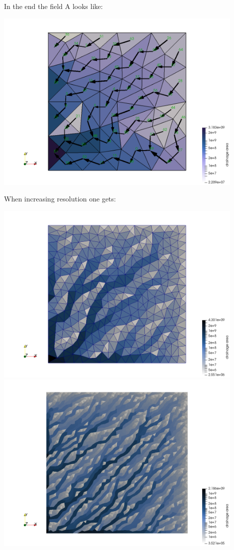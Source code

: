 In the end the field A looks like:
\begin{center}
\includegraphics[width=12cm]{python_codes/fieldstone_140/images/mesh8}
\end{center}
When increasing resolution one gets:
\begin{center}
\includegraphics[width=12cm]{python_codes/fieldstone_140/images/mesh10}
\includegraphics[width=12cm]{python_codes/fieldstone_140/images/mesh11}
\end{center}


